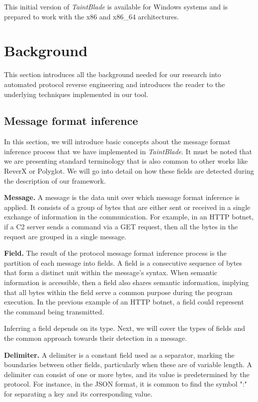 \documentclass[conference]{IEEEtran}
\begin{document}
This initial version of \textit{TaintBlade} is available for Windows systems
and is prepared to work with the x86 and x86\_64 architectures.

\section{Background}
This section introduces all the background needed for our research into
automated protocol reverse engineering and introduces the reader to the
underlying techniques implemented in our tool.

\subsection{Message format inference}\label{subsec:msg_format_inference}
In this section, we will introduce basic concepts about the message format
inference process that we have implemented in \textit{TaintBlade}. It must be
noted that we are presenting standard terminology that is also common to other
works like ReverX\cite{github_pre_reverx} or Polyglot\cite{polyglot_caballero}.
We will go into detail on how these fields are detected during the description
of our framework.

\textbf{Message.} A message is the data unit over which message format inference is applied. It
consists of a group of bytes that are either sent or received in a single exchange of information
in the communication. For example, in an HTTP botnet, if a C2 server sends a command via a GET request,
then all the bytes in the request are grouped in a single message.

\textbf{Field.} The result of the protocol message format inference process is the partition of each
message into fields. A field is a consecutive sequence of bytes that form a distinct unit within the message's syntax.
When semantic information is accessible, then a field also shares semantic information, implying that all bytes
within the field serve a common purpose during the program execution. In the previous example of an HTTP botnet,
a field could represent the command being transmitted.

Inferring a field depends on its type. Next, we will cover the types of fields
and the common approach towards their detection in a message.

\textbf{Delimiter.} A delimiter is a constant field used as a separator,
marking the boundaries between other fields, particularly when these
are of variable length. A delimiter can consist of one or more bytes,
and its value is predetermined by the protocol.
For instance, in the JSON format, it is common to find the symbol ":" for
separating a key and its corresponding value.
\end{document}
